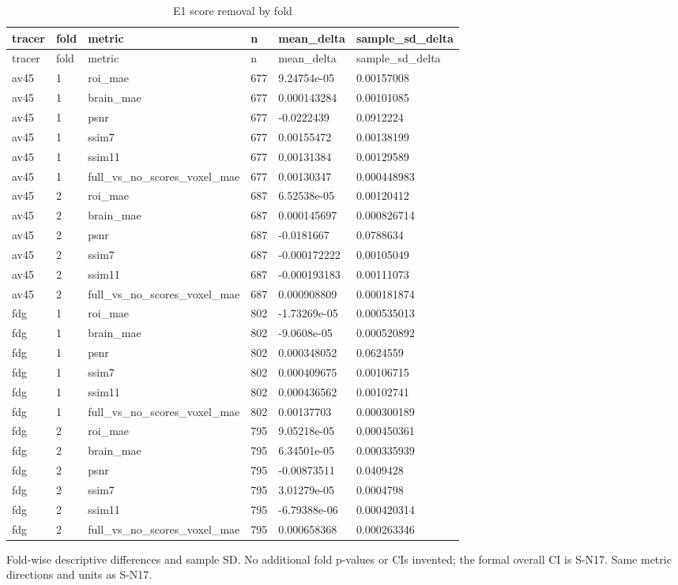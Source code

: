 \begingroup
\footnotesize
\setlength{\tabcolsep}{4pt}
\begin{longtable}{llllll}
\caption{E1 score removal by fold}\label{tab:s-n18}\\
\toprule
tracer & fold & metric & n & mean\_delta & sample\_sd\_delta \\
\midrule
\endfirsthead
\toprule
tracer & fold & metric & n & mean\_delta & sample\_sd\_delta \\
\midrule
\endhead
\bottomrule
\endfoot
av45 & 1 & roi\_mae & 677 & 9.24754e-05 & 0.00157008 \\
av45 & 1 & brain\_mae & 677 & 0.000143284 & 0.00101085 \\
av45 & 1 & psnr & 677 & -0.0222439 & 0.0912224 \\
av45 & 1 & ssim7 & 677 & 0.00155472 & 0.00138199 \\
av45 & 1 & ssim11 & 677 & 0.00131384 & 0.00129589 \\
av45 & 1 & full\_vs\_no\_scores\_voxel\_mae & 677 & 0.00130347 & 0.000448983 \\
av45 & 2 & roi\_mae & 687 & 6.52538e-05 & 0.00120412 \\
av45 & 2 & brain\_mae & 687 & 0.000145697 & 0.000826714 \\
av45 & 2 & psnr & 687 & -0.0181667 & 0.0788634 \\
av45 & 2 & ssim7 & 687 & -0.000172222 & 0.00105049 \\
av45 & 2 & ssim11 & 687 & -0.000193183 & 0.00111073 \\
av45 & 2 & full\_vs\_no\_scores\_voxel\_mae & 687 & 0.000908809 & 0.000181874 \\
fdg & 1 & roi\_mae & 802 & -1.73269e-05 & 0.000535013 \\
fdg & 1 & brain\_mae & 802 & -9.0608e-05 & 0.000520892 \\
fdg & 1 & psnr & 802 & 0.000348052 & 0.0624559 \\
fdg & 1 & ssim7 & 802 & 0.000409675 & 0.00106715 \\
fdg & 1 & ssim11 & 802 & 0.000436562 & 0.00102741 \\
fdg & 1 & full\_vs\_no\_scores\_voxel\_mae & 802 & 0.00137703 & 0.000300189 \\
fdg & 2 & roi\_mae & 795 & 9.05218e-05 & 0.000450361 \\
fdg & 2 & brain\_mae & 795 & 6.34501e-05 & 0.000335939 \\
fdg & 2 & psnr & 795 & -0.00873511 & 0.0409428 \\
fdg & 2 & ssim7 & 795 & 3.01279e-05 & 0.0004798 \\
fdg & 2 & ssim11 & 795 & -6.79388e-06 & 0.000420314 \\
fdg & 2 & full\_vs\_no\_scores\_voxel\_mae & 795 & 0.000658368 & 0.000263346 \\
\end{longtable}
\noindent\parbox{\linewidth}{\footnotesize Fold-wise descriptive differences and sample SD. No additional fold p-values or CIs invented; the formal overall CI is S-N17. Same metric directions and units as S-N17.}
\endgroup
